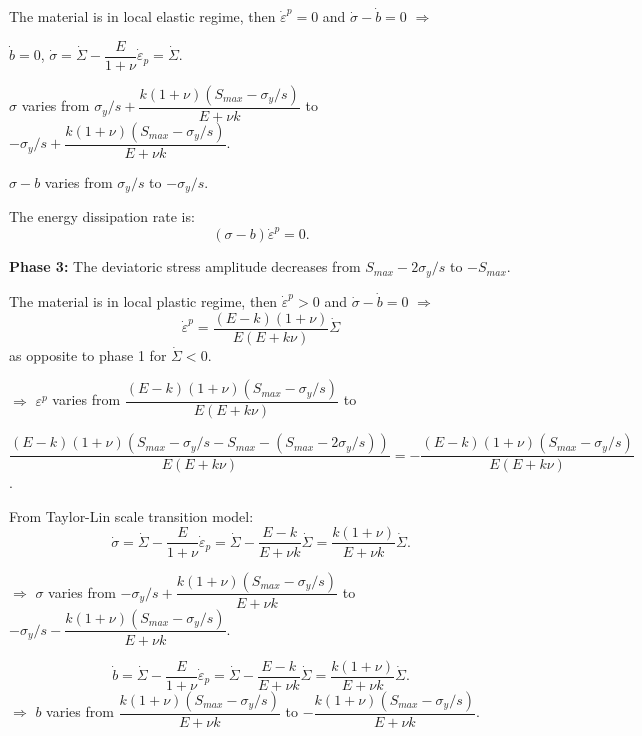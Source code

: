 \noindent
The material is in local elastic regime, then $\dot{\varepsilon}^p=0$ and $\dot{\sigma}-\dot{b}=0$ $\Rightarrow$

\vspace{6pt}
\noindent
$\dot{b}=0$, $\dot{\sigma}=\dot{\Sigma}-\dfrac{E}{1+\nu}\dot{\varepsilon}_p=\dot{\Sigma}$.

\vspace{6pt}
\noindent
$\sigma$ varies from $\sigma_y/s+\dfrac{k(1+\nu)(S_{max}-\sigma_y/s)}{E+\nu k}$ to $-\sigma_y/s+\dfrac{k(1+\nu)(S_{max}-\sigma_y/s)}{E+\nu k}$.

\vspace{6pt}
\noindent
$\sigma-b$ varies from $\sigma_y/s$ to $-\sigma_y/s$.

\vspace{6pt}
\noindent
The energy dissipation rate is: $$(\sigma-b)\dot{\varepsilon}^p=0.$$

\vspace{6pt}
\noindent
\textbf{Phase 3:} The deviatoric stress amplitude decreases from $S_{max}-2\sigma_y/s$ to $-S_{max}$.

\noindent
The material is in local plastic regime, then $\dot{\varepsilon}^p>0$ and $\dot{\sigma}-\dot{b}=0$ $\Rightarrow$ 
$$\dot{\varepsilon}^p=\dfrac{(E- k)(1+\nu)}{E(E+k\nu)}\dot{\Sigma}$$ as opposite to phase 1 for $\dot{\Sigma}<0$.

\vspace{6pt}
\noindent
$\Rightarrow$ $\varepsilon^p$ varies from $\dfrac{(E- k)(1+\nu)(S_{max}-\sigma_y/s)}{E(E+k\nu)}$ to 

\noindent
$\dfrac{(E- k)(1+\nu)(S_{max}-\sigma_y/s-S_{max}-(S_{max}-2\sigma_y/s))}{E(E+k\nu)}=-\dfrac{(E- k)(1+\nu)(S_{max}-\sigma_y/s)}{E(E+k\nu)}$.

\vspace{6pt}
\noindent
From Taylor-Lin scale transition model:
$$\dot{\sigma}=\dot{\Sigma}-\dfrac{E}{1+\nu}\dot{\varepsilon}_p=\dot{\Sigma}-\dfrac{E-k}{E+\nu k}\dot{\Sigma}=\dfrac{k(1+\nu)}{E+\nu k}\dot{\Sigma}.$$

\vspace{6pt}
\noindent
$\Rightarrow$ $\sigma$ varies from $-\sigma_y/s+\dfrac{k(1+\nu)(S_{max}-\sigma_y/s)}{E+\nu k}$ to $-\sigma_y/s-\dfrac{k(1+\nu)(S_{max}-\sigma_y/s)}{E+\nu k}$.

\vspace{6pt}
$$\dot{b}=\dot{\Sigma}-\dfrac{E}{1+\nu}\dot{\varepsilon}_p=\dot{\Sigma}-\dfrac{E-k}{E+\nu k}\dot{\Sigma}=\dfrac{k(1+\nu)}{E+\nu k}\dot{\Sigma}.$$
\vspace{6pt}
\noindent
$\Rightarrow$ $b$ varies from $\dfrac{k(1+\nu)(S_{max}-\sigma_y/s)}{E+\nu k}$ to $-\dfrac{k(1+\nu)(S_{max}-\sigma_y/s)}{E+\nu k}$.

